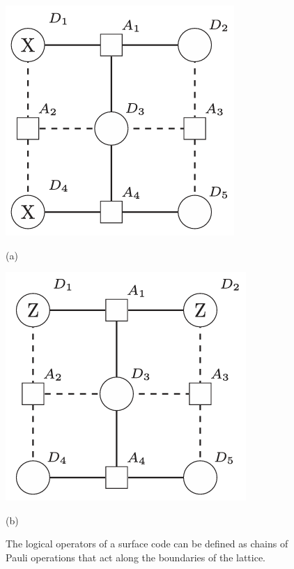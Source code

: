 \begin{figure}[h]
    \centering
    \begin{minipage}{0.2\textwidth}
        \centering
        \includegraphics[width=\linewidth]{sections/2_review_surface_code/512-operators1.png}
        \caption*{(a)}
        \label{fig:image1}
    \end{minipage}
    \hspace{0.02\textwidth}
    \begin{minipage}{0.2\textwidth}
        \centering
        \includegraphics[width=\linewidth]{sections/2_review_surface_code/512-operators2.png}
        \caption*{(b)}
        \label{fig:image2}
    \end{minipage}
    \caption{The logical operators of a surface code can be defined as chains of Pauli operations that act along the boundaries of the lattice.}
    \label{fig:side_by_side_images}
\end{figure}
